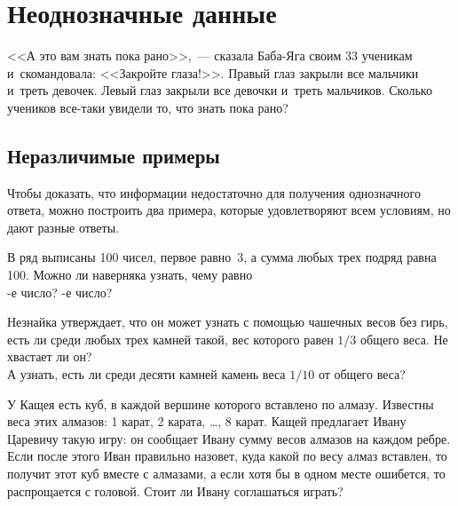 
\section*{Неоднозначные данные}



\begin{flushright}
<<А это вам знать пока рано>>,~--- сказала Баба-Яга своим 33 ученикам
и~скомандовала:
<<Закройте глаза!>>.
Правый глаз закрыли все мальчики и~треть девочек.
Левый глаз закрыли все девочки и~треть мальчиков.
Сколько учеников все-таки увидели то, что знать пока рано?
\end{flushright}

\subsection*{Неразличимые примеры}

Чтобы доказать, что информации недостаточно для получения однозначного ответа,
можно построить два примера, которые удовлетворяют всем условиям, но дают
разные ответы.

\begin{problems}

\item
В ряд выписаны 100 чисел, первое равно~3, а сумма любых трех подряд равна 100.
Можно ли наверняка узнать, чему равно
\\
-е число?
\quad
{}-е число?

\item
\subproblem
Незнайка утверждает, что он может узнать с помощью чашечных весов без гирь,
есть ли среди любых трех камней такой, вес которого равен $1/3$ общего веса.
Не хвастает ли он?
\\
\subproblem
А узнать, есть ли среди десяти камней камень веса $1/10$ от общего веса?

\item
У Кащея есть куб, в каждой вершине которого вставлено по алмазу.
Известны веса этих алмазов: 1 карат, 2 карата, \ldots, 8 карат.
Кащей предлагает Ивану Царевичу такую игру: он сообщает Ивану сумму весов
алмазов на каждом ребре.
Если после этого Иван правильно назовет, куда какой по весу алмаз вставлен,
то получит этот куб вместе с алмазами, а если хотя бы в одном месте ошибется,
то распрощается с головой.
Стоит ли Ивану соглашаться играть?

\end{problems}

